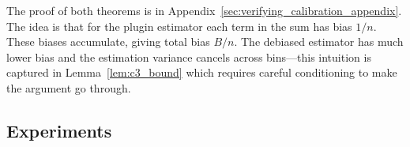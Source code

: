 The proof of both theorems is in Appendix~\ref{sec:verifying_calibration_appendix}. The idea is that for the plugin estimator each term in the sum has bias $1/n$. These biases accumulate, giving total bias $B/n$. The debiased estimator has much lower bias and the estimation variance cancels across bins---this intuition is captured in Lemma~\ref{lem:c3_bound} which requires careful conditioning to make the argument go through.


\newcommand{\calset}[0]{\ensuremath{S_C}}
\newcommand{\verifset}[0]{\ensuremath{S_E}}

\subsection{Experiments}


